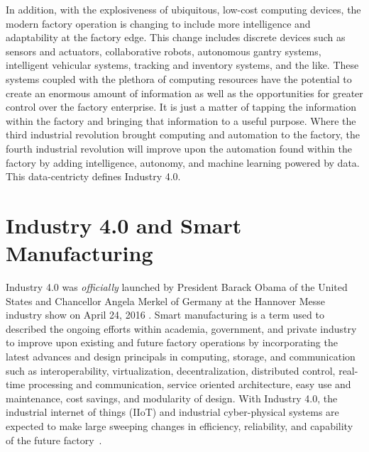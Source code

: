 In addition, with the explosiveness of ubiquitous, low-cost computing devices, the modern factory operation is changing to include more intelligence and adaptability at the factory edge.  This change includes discrete devices such as sensors and actuators, collaborative robots, autonomous gantry systems, intelligent vehicular systems, tracking and inventory systems, and the like.  These systems coupled with the plethora of computing resources have the potential to create an enormous amount of information as well as the opportunities for greater control over the factory enterprise.  It is just a matter of tapping the information within the factory and bringing that information to a useful purpose.  Where the third industrial revolution brought computing and automation to the factory, the fourth industrial revolution will improve upon the automation found within the factory by adding intelligence, autonomy, and machine learning powered by data. This data-centricty defines Industry 4.0.  

\section{Industry 4.0 and Smart Manufacturing}

Industry 4.0 was \textit{officially} launched by President Barack Obama of the United States and Chancellor Angela Merkel of Germany at the Hannover Messe industry show on April 24, 2016 \cite{HannoverMesse2016:Report, HannoverMesse2016:MachineDesign}.  Smart manufacturing is a term used to described the ongoing efforts within academia, government, and private industry to improve upon existing and future factory operations by incorporating the latest advances and design principals in computing, storage, and communication such as interoperability, virtualization, decentralization, distributed control, real-time processing and communication, service oriented architecture, easy use and maintenance, cost savings, and modularity of design.  With Industry 4.0, the industrial internet of things (IIoT) and industrial cyber-physical systems are expected to make large sweeping changes in efficiency, reliability, and capability of the future factory~\cite{Raptis2019}.	


